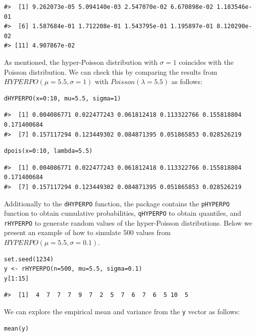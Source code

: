 \begin{verbatim}
#>  [1] 9.262073e-05 5.094140e-03 2.547070e-02 6.670898e-02 1.183546e-01
#>  [6] 1.587684e-01 1.712208e-01 1.543795e-01 1.195897e-01 8.120290e-02
#> [11] 4.907867e-02
\end{verbatim}

As mentioned, the hyper-Poisson distribution with \(\sigma=1\) coincides with the Poisson distribution. We can check this by comparing the results from \(HYPERPO(\mu=5.5, \sigma=1)\) with \(Poisson(\lambda=5.5)\) as follows:

\begin{verbatim}
dHYPERPO(x=0:10, mu=5.5, sigma=1)
\end{verbatim}

\begin{verbatim}
#>  [1] 0.004086771 0.022477243 0.061812418 0.113322766 0.155818804 0.171400684
#>  [7] 0.157117294 0.123449302 0.084871395 0.051865853 0.028526219
\end{verbatim}

\begin{verbatim}
dpois(x=0:10, lambda=5.5)
\end{verbatim}

\begin{verbatim}
#>  [1] 0.004086771 0.022477243 0.061812418 0.113322766 0.155818804 0.171400684
#>  [7] 0.157117294 0.123449302 0.084871395 0.051865853 0.028526219
\end{verbatim}

Additionally to the \texttt{dHYPERPO} function, the  package contains the \texttt{pHYPERPO} function to obtain cumulative probabilities, \texttt{qHYPERPO} to obtain quantiles, and \texttt{rHYPERPO} to generate random values of the hyper-Poisson distributions. Below we present an example of how to simulate 500 values from \(HYPERPO(\mu=5.5, \sigma=0.1)\).

\begin{verbatim}
set.seed(1234)
y <- rHYPERPO(n=500, mu=5.5, sigma=0.1)
y[1:15]
\end{verbatim}

\begin{verbatim}
#>  [1]  4  7  7  7  9  7  2  5  7  6  7  6  5 10  5
\end{verbatim}

We can explore the empirical mean and variance from the \texttt{y} vector as follows:

\begin{verbatim}
mean(y)
\end{verbatim}

